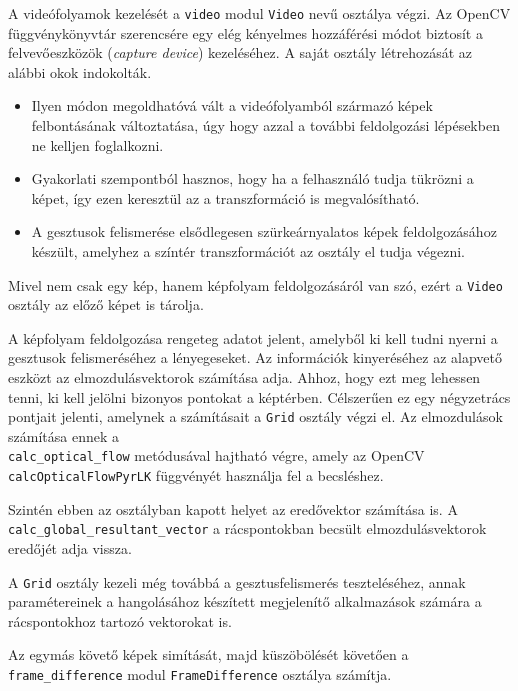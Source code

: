 
A videófolyamok kezelését a \texttt{video} modul \texttt{Video} nevű osztálya végzi.
Az OpenCV függvénykönyvtár szerencsére egy elég kényelmes hozzáférési módot biztosít a felvevőeszközök (\textit{capture device}) kezeléséhez.
A saját osztály létrehozását az alábbi okok indokolták.
\begin{itemize}
\item Ilyen módon megoldhatóvá vált a videófolyamból származó képek felbontásának változtatása, úgy hogy azzal a további feldolgozási lépésekben ne kelljen foglalkozni.
\item Gyakorlati szempontból hasznos, hogy ha a felhasználó tudja tükrözni a képet, így ezen keresztül az a transzformáció is megvalósítható.
\item A gesztusok felismerése elsődlegesen szürkeárnyalatos képek feldolgozásához készült, amelyhez a színtér transzformációt az osztály el tudja végezni.
\end{itemize}
Mivel nem csak egy kép, hanem képfolyam feldolgozásáról van szó, ezért a \texttt{Video} osztály az előző képet is tárolja.


A képfolyam feldolgozása rengeteg adatot jelent, amelyből ki kell tudni nyerni a gesztusok felismeréséhez a lényegeseket.
Az információk kinyeréséhez az alapvető eszközt az elmozdulásvektorok számítása adja. Ahhoz, hogy ezt meg lehessen tenni, ki kell jelölni bizonyos pontokat a képtérben.
Célszerűen ez egy négyzetrács pontjait jelenti, amelynek a számításait a \texttt{Grid} osztály végzi el.
Az elmozdulások számítása ennek a \\ \texttt{calc\_optical\_flow} metódusával hajtható végre, amely az OpenCV \\ \texttt{calcOpticalFlowPyrLK} függvényét használja fel a becsléshez.

Szintén ebben az osztályban kapott helyet az eredővektor számítása is. A \\ \texttt{calc\_global\_resultant\_vector} a rácspontokban becsült elmozdulásvektorok eredőjét adja vissza.

A \texttt{Grid} osztály kezeli még továbbá a gesztusfelismerés teszteléséhez, annak paramétereinek a hangolásához készített megjelenítő alkalmazások számára a rácspontokhoz tartozó vektorokat is.

Az egymás követő képek simítását, majd küszöbölését követően a \\ \texttt{frame\_difference} modul \texttt{FrameDifference} osztálya számítja.

